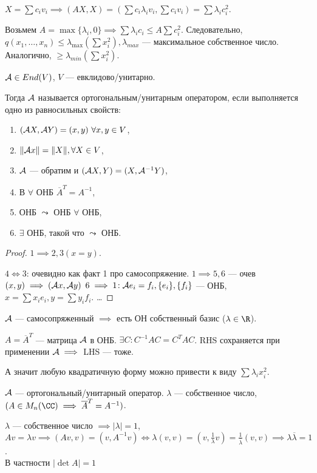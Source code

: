 $X = \sum c_iv_i \implies(AX, X) = (\sum c_i \lambda_i v_i, \sum c_i v_i) = \sum \lambda_i c_i^2$.

Возьмем  $A = \max \{\lambda_i, 0\} \implies \sum \lambda_i c_i \le A \sum c_i^2$. Следовательно, $q(x_1, \ldots ,x_n) \le \lambda_{\max} (\sum x_i^2), \lambda_{max}$ --- максимальное собственное число.  Аналогично, $\ge \lambda_{min}(\sum x_i^2)$.
\begin{definition}
    $\mathcal{A} \in End(V)$,  $V$ --- евклидово/унитарно.

    Тогда  $\mathcal{A}$ называется ортогональным/унитарным оператором, если выполняется одно из равносильных свойств:
     \begin{enumerate}
         \item $(\mathcal{A} X, \mathcal{A} Y) = (x, y)\ \forall x, y \in V$,
         \item  $\|\mathcal{A} x\| = \|X\|, \forall X \in V$,
         \item  $\mathcal{A}$ --- обратим и  $(\mathcal{A} X, Y) = (X, \mathcal{A}^{-1}Y)$,
         \item В $\forall$ ОНБ  $\overline{A}^T = A^{-1}$,
         \item ОНБ  $\leadsto$ ОНБ  $\forall$ ОНБ,
         \item  $\exists$ ОНБ, такой что  $\leadsto$ ОНБ.
    \end{enumerate}
\end{definition}
\begin{proof}
    $1 \implies 2, 3 (x = y)$.

    $4 \iff 3$: очевидно как факт 1 про самосопряжение.
     $1 \implies 5, 6$ --- очев  $(x, y) \implies(\mathcal{A} x, \mathcal{A} y)$ 
     $6 \implies 1\!: \mathcal{A} e_i = f_i, \{e_i\}, \{f_i\}$ --- ОНБ,  $x = \sum x_i e_i, y = \sum y_i f_i$.  \dots
\end{proof}
\begin{remark}
    $\mathcal{A}$ --- самосопряженный  $\implies$ есть ОН собственный базис ($\lambda \in \R$). 

    $A = \overline{A}^T$ --- матрица  $\mathcal{A}$ в ОНБ.  $\exists C\!: C^{-1}AC = C^{T}AC$. RHS сохраняется при применении  $\mathcal{A} \implies$ LHS --- тоже.

    А значит любую квадратичную форму можно привести к виду  $\sum \lambda_i x_i^2$.
\end{remark}
\begin{property}
    $\mathcal{A}$ --- ортогональный/унитарный оператор. $\lambda$ --- собственное число,  $(A \in M_n(\CC) \implies \overline{A}^T = A^{-1})$. 
    
    $\lambda$ --- собственное число $\implies |\lambda| = 1$,  $Av = \lambda v \implies(Av, v) = (v, A^{-1}v) \iff \lambda(v, v) = (v, \frac{1}{\lambda}v) = \frac{1}{\overline{\lambda}}(v, v) \implies \lambda \overline{\lambda} = 1$.\\
    В частности $|\det A| = 1$
\end{property}
